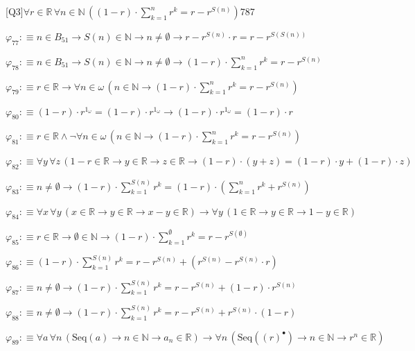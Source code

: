 \begin{fullproof}{[Q3]}{$\forall r \in \mathbb{R}\,\forall n \in \mathbb{N}\,((1 - r) \cdot {\textstyle\sum_{k=1}^{n} {{r}^{k}}} = r - {{r}^{S(n)}})$}{787}
\begin{abbrevlist}
\item $\varphi_{77} :\equiv n \in B_{51} \to S(n) \in \mathbb{N} \to n \neq \emptyset \to r - {{r}^{S(n)}} \cdot r = r - {{r}^{S(S(n))}}$
\item $\varphi_{78} :\equiv n \in B_{51} \to S(n) \in \mathbb{N} \to n \neq \emptyset \to (1 - r) \cdot {\textstyle\sum_{k=1}^{n} {{r}^{k}}} = r - {{r}^{S(n)}}$
\item $\varphi_{79} :\equiv r \in \mathbb{R} \to \forall n \in \omega\,(n \in \mathbb{N} \to (1 - r) \cdot {\textstyle\sum_{k=1}^{n} {{r}^{k}}} = r - {{r}^{S(n)}})$
\item $\varphi_{80} :\equiv (1 - r) \cdot {{r}^{1_{\omega}}} = (1 - r) \cdot {{r}^{1_{\omega}}} \to (1 - r) \cdot {{r}^{1_{\omega}}} = (1 - r) \cdot r$
\item $\varphi_{81} :\equiv r \in \mathbb{R} \land \neg \forall n \in \omega\,(n \in \mathbb{N} \to (1 - r) \cdot {\textstyle\sum_{k=1}^{n} {{r}^{k}}} = r - {{r}^{S(n)}})$
\item $\varphi_{82} :\equiv \forall y\,\forall z\,(1 - r \in \mathbb{R} \to y \in \mathbb{R} \to z \in \mathbb{R} \to (1 - r) \cdot (y + z) = (1 - r) \cdot y + (1 - r) \cdot z)$
\item $\varphi_{83} :\equiv n \neq \emptyset \to (1 - r) \cdot {\textstyle\sum_{k=1}^{S(n)} {{r}^{k}}} = (1 - r) \cdot ({\textstyle\sum_{k=1}^{n} {{r}^{k}}} + {{r}^{S(n)}})$
\item $\varphi_{84} :\equiv \forall x\,\forall y\,(x \in \mathbb{R} \to y \in \mathbb{R} \to x - y \in \mathbb{R}) \to \forall y\,(1 \in \mathbb{R} \to y \in \mathbb{R} \to 1 - y \in \mathbb{R})$
\item $\varphi_{85} :\equiv r \in \mathbb{R} \to \emptyset \in \mathbb{N} \to (1 - r) \cdot {\textstyle\sum_{k=1}^{\emptyset} {{r}^{k}}} = r - {{r}^{S(\emptyset)}}$
\item $\varphi_{86} :\equiv (1 - r) \cdot {\textstyle\sum_{k=1}^{S(n)} {{r}^{k}}} = r - {{r}^{S(n)}} + ({{r}^{S(n)}} - {{r}^{S(n)}} \cdot r)$
\item $\varphi_{87} :\equiv n \neq \emptyset \to (1 - r) \cdot {\textstyle\sum_{k=1}^{S(n)} {{r}^{k}}} = r - {{r}^{S(n)}} + (1 - r) \cdot {{r}^{S(n)}}$
\item $\varphi_{88} :\equiv n \neq \emptyset \to (1 - r) \cdot {\textstyle\sum_{k=1}^{S(n)} {{r}^{k}}} = r - {{r}^{S(n)}} + {{r}^{S(n)}} \cdot (1 - r)$
\item $\varphi_{89} :\equiv \forall a\,\forall n\,(\mathrm{Seq}(a) \to n \in \mathbb{N} \to a_{n} \in \mathbb{R}) \to \forall n\,(\mathrm{Seq}({(r)^{\bullet}}) \to n \in \mathbb{N} \to {{r}^{n}} \in \mathbb{R})$

\end{abbrevlist}
\end{fullproof}
